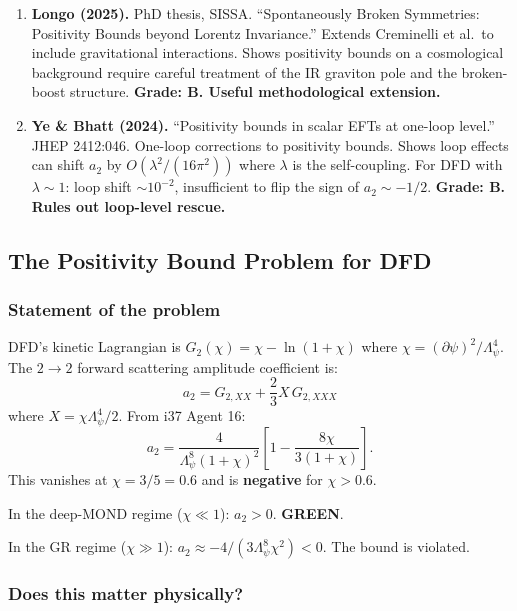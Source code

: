 \documentclass[11pt,a4paper]{article}
\newcommand{\GREEN}{\textcolor{dfdgreen}{\textbf{GREEN}}}
\begin{document}
\begin{enumerate}
\item \textbf{Longo (2025).} PhD thesis, SISSA. ``Spontaneously Broken Symmetries: Positivity Bounds beyond Lorentz Invariance.'' Extends Creminelli et al.\ to include gravitational interactions. Shows positivity bounds on a cosmological background require careful treatment of the IR graviton pole and the broken-boost structure. \textbf{Grade: B. Useful methodological extension.}

\item \textbf{Ye \& Bhatt (2024).} ``Positivity bounds in scalar EFTs at one-loop level.'' JHEP 2412:046. One-loop corrections to positivity bounds. Shows loop effects can shift $a_2$ by $O(\lambda^2/(16\pi^2))$ where $\lambda$ is the self-coupling. For DFD with $\lambda \sim 1$: loop shift $\sim 10^{-2}$, insufficient to flip the sign of $a_2 \sim -1/2$. \textbf{Grade: B. Rules out loop-level rescue.}
\end{enumerate}

\subsection{The Positivity Bound Problem for DFD}

\subsubsection{Statement of the problem}

DFD's kinetic Lagrangian is $G_2(\chi) = \chi - \ln(1+\chi)$ where $\chi = (\partial\psi)^2/\Lambda_\psi^4$. The $2 \to 2$ forward scattering amplitude coefficient is:
\begin{equation}
a_2 = G_{2,XX} + \frac{2}{3}X\,G_{2,XXX}
\end{equation}
where $X = \chi\Lambda_\psi^4/2$. From i37 Agent 16:
\begin{equation}
a_2 = \frac{4}{\Lambda_\psi^8(1+\chi)^2}\left[1 - \frac{8\chi}{3(1+\chi)}\right].
\end{equation}
This vanishes at $\chi = 3/5 = 0.6$ and is \textbf{negative} for $\chi > 0.6$.

In the deep-MOND regime ($\chi \ll 1$): $a_2 > 0$. \GREEN.

In the GR regime ($\chi \gg 1$): $a_2 \approx -4/(3\Lambda_\psi^8\chi^2) < 0$. The bound is violated.

\subsubsection{Does this matter physically?}
\end{document}
